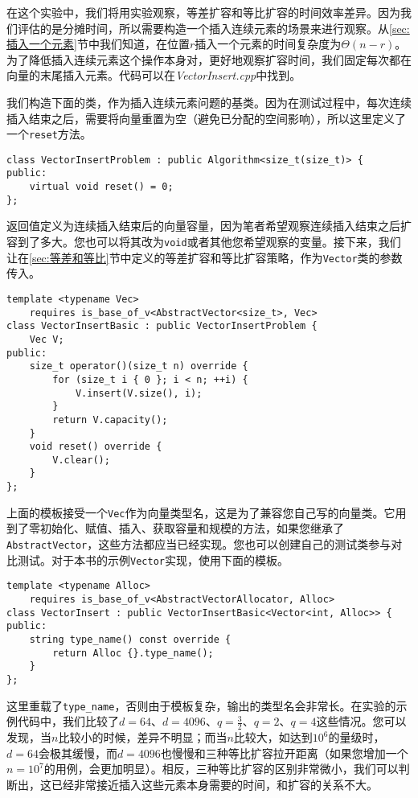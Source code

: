 在这个实验中，我们将用实验观察，等差扩容和等比扩容的时间效率差异。因为我们评估的是分摊时间，所以需要构造一个插入连续元素的场景来进行观察。从\ref{sec:插入一个元素}节中我们知道，在位置$r$插入一个元素的时间复杂度为$\Theta(n-r)$。为了降低插入连续元素这个操作本身对，更好地观察扩容时间，我们固定每次都在向量的末尾插入元素。代码可以在\textit{VectorInsert.cpp}中找到。

我们构造下面的类，作为插入连续元素问题的基类。因为在测试过程中，每次连续插入结束之后，需要将向量重置为空（避免已分配的空间影响），所以这里定义了一个\lstinline{reset}方法。

\begin{lstlisting}
class VectorInsertProblem : public Algorithm<size_t(size_t)> {
public:
    virtual void reset() = 0;
};
\end{lstlisting}

返回值定义为连续插入结束后的向量容量，因为笔者希望观察连续插入结束之后扩容到了多大。您也可以将其改为\lstinline{void}或者其他您希望观察的变量。接下来，我们让在\ref{sec:等差和等比}节中定义的等差扩容和等比扩容策略，作为\lstinline{Vector}类的参数传入。

\begin{lstlisting}
template <typename Vec>
    requires is_base_of_v<AbstractVector<size_t>, Vec>
class VectorInsertBasic : public VectorInsertProblem {
    Vec V;
public:
    size_t operator()(size_t n) override {
        for (size_t i { 0 }; i < n; ++i) {
            V.insert(V.size(), i);
        }
        return V.capacity();
    }
    void reset() override {
        V.clear();
    }
};
\end{lstlisting}

上面的模板接受一个\lstinline{Vec}作为向量类型名，这是为了兼容您自己写的向量类。它用到了零初始化、赋值、插入、获取容量和规模的方法，如果您继承了\lstinline{AbstractVector}，这些方法都应当已经实现。您也可以创建自己的测试类参与对比测试。对于本书的示例\lstinline{Vector}实现，使用下面的模板。

\begin{lstlisting}
template <typename Alloc>
    requires is_base_of_v<AbstractVectorAllocator, Alloc>
class VectorInsert : public VectorInsertBasic<Vector<int, Alloc>> {
public:
    string type_name() const override {
        return Alloc {}.type_name();
    }
};
\end{lstlisting}

这里重载了\lstinline{type_name}，否则由于模板复杂，输出的类型名会非常长。在实验的示例代码中，我们比较了$d=64$、$d=4096$、$q=\frac{3}{2}$、$q=2$、$q=4$这些情况。您可以发现，当$n$比较小的时候，差异不明显；而当$n$比较大，如达到$10^6$的量级时，$d=64$会极其缓慢，而$d=4096$也慢慢和三种等比扩容拉开距离（如果您增加一个$n=10^7$的用例，会更加明显）。相反，三种等比扩容的区别非常微小，我们可以判断出，这已经非常接近插入这些元素本身需要的时间，和扩容的关系不大。

